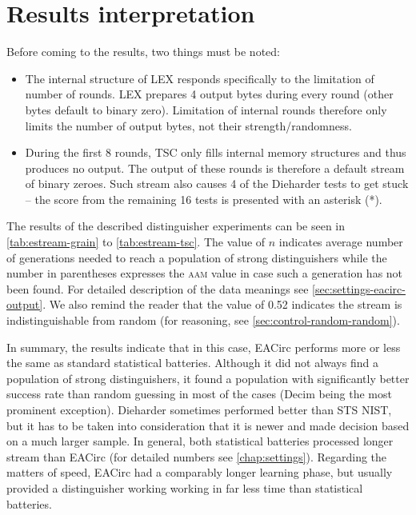 \documentclass[12pt,oneside]{fithesis2}		%
\renewcommand{\_}{\leavevmode \kern0.0em\vbox{\hrule width0.4em}}
\newcommand{\squarebullet}{\textcolor{black}{\raisebox{0.15em}{\rule{4pt}{4pt}}}}
\newenvironment{myItemize}{
  \begin{itemize}[leftmargin=2em,rightmargin=1em,itemsep=\parskip ,parsep=0em,topsep=0em,partopsep=0em]
  \renewcommand{\labelitemi}{\squarebullet}
  \renewcommand{\labelitemii}{$\diamond$}
}{
  \end{itemize}
}
\begin{document}
\section{Results interpretation}
\label{sec:estream-results}

Before coming to the results, two things must be noted:
\begin{myItemize}
\item The internal structure of LEX responds specifically to the limitation of number of rounds.
LEX prepares 4 output bytes during every round (other bytes default to binary zero). 
Limitation of internal rounds therefore only limits the number
of output bytes, not their strength/randomness.
\item During the first 8 rounds, TSC only fills internal memory structures and thus produces no output. The output of these rounds
is therefore a default stream of binary zeroes. Such stream also causes 4 of the Dieharder tests to get stuck --
the score from the remaining 16 tests is presented with an asterisk (*).
\end{myItemize}

\noindent
The results of the described distinguisher experiments can be seen in \autoref{tab:estream-grain} to
\autoref{tab:estream-tsc}. The value of $n$ indicates average number of generations needed to reach a population of
strong distinguishers while the number in parentheses expresses the \textsc{aam} value in case such a generation has not been
found. For detailed description of the data meanings see \autoref{sec:settings-eacirc-output}. We also remind the reader
that the value of 0.52 indicates the stream is indistinguishable from random (for reasoning, see \autoref{sec:control-random-random}).

In summary, the results indicate that in this case, EACirc performs more or less the same as standard statistical batteries.
Although it did not always find a population of strong distinguishers, it found a population with significantly better
success rate than random guessing in most of the cases (Decim being the most prominent exception).
Dieharder sometimes performed better than STS NIST, but it has to be taken into consideration that it is newer
and made decision based on a much larger sample. In general, both statistical batteries processed longer stream than EACirc
(for detailed numbers see \autoref{chap:settings}). Regarding the matters of speed, EACirc had a comparably longer learning phase,
but usually provided a distinguisher working working in far less time than statistical batteries.
\medskip
\end{document}
